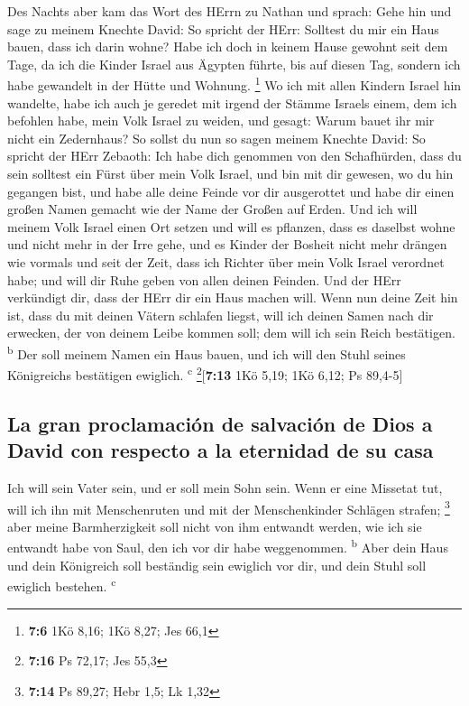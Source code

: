  Des Nachts aber kam das Wort des HErrn zu Nathan und
sprach:  Gehe hin und sage zu meinem Knechte David: So
spricht der HErr: Solltest du mir ein Haus bauen, dass ich darin wohne?
 Habe ich doch in keinem Hause gewohnt seit dem Tage, da
ich die Kinder Israel aus Ägypten führte, bis auf diesen Tag, sondern
ich habe gewandelt in der Hütte und Wohnung. \footnote{\textbf{7:6} 1Kö
  8,16; 1Kö 8,27; Jes 66,1}  Wo ich mit allen Kindern
Israel hin wandelte, habe ich auch je geredet mit irgend der Stämme
Israels einem, dem ich befohlen habe, mein Volk Israel zu weiden, und
gesagt: Warum bauet ihr mir nicht ein Zedernhaus?  So
sollst du nun so sagen meinem Knechte David: So spricht der HErr
Zebaoth: Ich habe dich genommen von den Schafhürden, dass du sein
solltest ein Fürst über mein Volk Israel,  und bin mit dir
gewesen, wo du hin gegangen bist, und habe alle deine Feinde vor dir
ausgerottet und habe dir einen großen Namen gemacht wie der Name der
Großen auf Erden.  Und ich will meinem Volk Israel einen
Ort setzen und will es pflanzen, dass es daselbst wohne und nicht mehr
in der Irre gehe, und es Kinder der Bosheit nicht mehr drängen wie
vormals und seit der Zeit, dass ich Richter über mein Volk Israel
verordnet habe;  und will dir Ruhe geben von allen deinen
Feinden. Und der HErr verkündigt dir, dass der HErr dir ein Haus machen
will.  Wenn nun deine Zeit hin ist, dass du mit deinen
Vätern schlafen liegst, will ich deinen Samen nach dir erwecken, der von
deinem Leibe kommen soll; dem will ich sein Reich bestätigen.
\textsuperscript{b}  Der soll meinem Namen ein Haus
bauen, und ich will den Stuhl seines Königreichs bestätigen ewiglich.
\textsuperscript{c} \footnote{\textbf{7:16} Ps 72,17; Jes 55,3}{[}\textbf{7:13}
1Kö 5,19; 1Kö 6,12; Ps 89,4-5{]}

\hypertarget{la-gran-proclamaciuxf3n-de-salvaciuxf3n-de-dios-a-david-con-respecto-a-la-eternidad-de-su-casa}{%
\subsection{La gran proclamación de salvación de Dios a David con
respecto a la eternidad de su
casa}\label{la-gran-proclamaciuxf3n-de-salvaciuxf3n-de-dios-a-david-con-respecto-a-la-eternidad-de-su-casa}}

 Ich will sein Vater sein, und er soll mein Sohn sein.
Wenn er eine Missetat tut, will ich ihn mit Menschenruten und mit der
Menschenkinder Schlägen strafen; \footnote{\textbf{7:14} Ps 89,27; Hebr
  1,5; Lk 1,32}  aber meine Barmherzigkeit soll nicht von
ihm entwandt werden, wie ich sie entwandt habe von Saul, den ich vor dir
habe weggenommen. \textsuperscript{b}  Aber dein Haus und
dein Königreich soll beständig sein ewiglich vor dir, und dein Stuhl
soll ewiglich bestehen. \textsuperscript{c}

